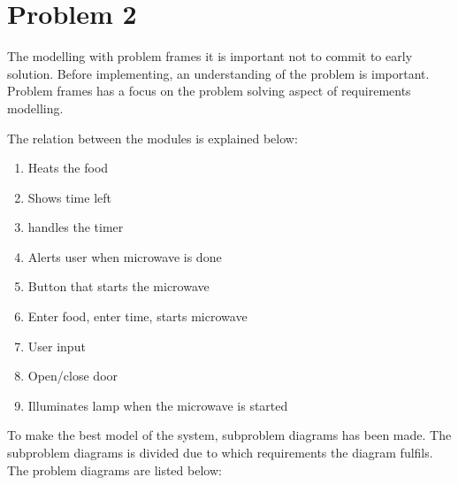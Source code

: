 \chapter{Problem 2}
The modelling with problem frames it is important not to commit to early solution. Before implementing, an understanding of the problem is important. Problem frames has a focus on the problem solving aspect of requirements modelling. 


The relation between the modules is explained below:

\begin{enumerate}[label=\alph*:]
	\item Heats the food
	\item Shows time left
	\item handles the timer
	\item Alerts user when microwave is done
	\item Button that starts the microwave 
	\item Enter food, enter time, starts microwave
	\item User input
	\item Open/close door
	\item Illuminates lamp when the microwave is started
	 
\end{enumerate}

To make the best model of the system, subproblem diagrams has been made. The subproblem diagrams is divided due to which requirements the diagram fulfils. 
The problem diagrams are listed below:






